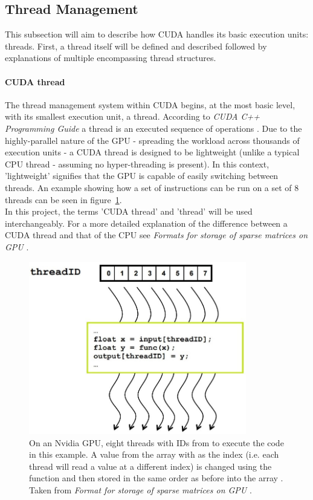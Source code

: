 \subsection{Thread Management \TO}\label{Subsection:thread-management}
This subsection will aim to describe how CUDA handles its basic execution units: threads. First, a thread itself will be defined and described followed by explanations of multiple encompassing thread structures.

\paragraph{CUDA thread}
The thread management system within CUDA begins, at the most basic level, with its smallest execution unit, a thread. According to \emph{CUDA C++ Programming Guide} a thread is an executed sequence of operations \cite{NVIDIAMay2022}. Due to the highly-parallel nature of the GPU - spreading the workload across thousands of execution units - a CUDA thread is designed to be lightweight (unlike a typical CPU thread - assuming no hyper-threading is present). In this context, 'lightweight' signifies that the GPU is capable of easily switching between threads. An example showing how a set of instructions can be run on a set of 8 threads can be seen in figure~\ref{Figure:CUDA-thread-parallelism}. \\
In this project, the terms 'CUDA thread' and 'thread' will be used interchangeably. For a more detailed explanation of the difference between a CUDA thread and that of the CPU see \emph{Formats for storage of sparse matrices on GPU} \cite{Cejka2020}.

\begin{figure}[h!]
	\centering
	\includegraphics[width=9.5cm, keepaspectratio, clip]{images/ch1/CUDA_thread_parallelism.jpg}
	\caption{On an Nvidia GPU, eight threads with IDs from  to  execute the code in this example. A value from the array  with  as the index (i.e. each thread will read a value at a different index) is changed using the function  and then stored in the same order as before into the array . Taken from \emph{Format for storage of sparse matrices on GPU} \cite{Cejka2020, Ruetsch2008}.}
	\label{Figure:CUDA-thread-parallelism}
\end{figure}

